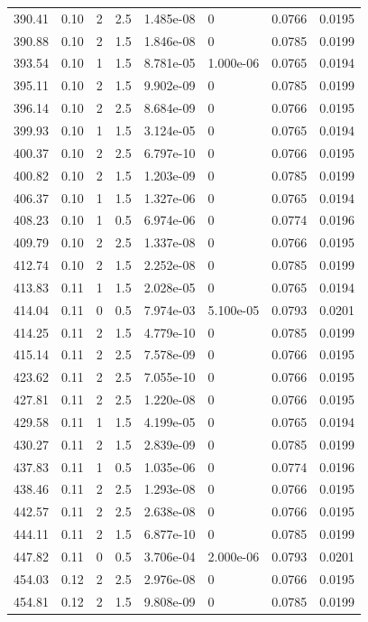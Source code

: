 \documentclass[preview]{standalone}
\begin{document}
{{{\begin{tabular}{L{1.2cm}C{1.2cm} C{0.3cm}C{0.5cm} C{1.4cm}C{1.4cm} C{1.4cm}C{1.4cm}}
  390.41  &  0.10  & 2     & 2.5 &  1.485e-08  & 0  & 0.0766 &  0.0195   \\ 
  390.88  &  0.10  & 2     & 1.5 &  1.846e-08  & 0  & 0.0785 &  0.0199   \\ 
  393.54  &  0.10  & 1     & 1.5 &  8.781e-05  & 1.000e-06  & 0.0765 &  0.0194   \\ 
  395.11  &  0.10  & 2     & 1.5 &  9.902e-09  & 0  & 0.0785 &  0.0199   \\ 
  396.14  &  0.10  & 2     & 2.5 &  8.684e-09  & 0  & 0.0766 &  0.0195   \\ 
  399.93  &  0.10  & 1     & 1.5 &  3.124e-05  & 0  & 0.0765 &  0.0194   \\ 
  400.37  &  0.10  & 2     & 2.5 &  6.797e-10  & 0  & 0.0766 &  0.0195   \\ 
  400.82  &  0.10  & 2     & 1.5 &  1.203e-09  & 0  & 0.0785 &  0.0199   \\ 
  406.37  &  0.10  & 1     & 1.5 &  1.327e-06  & 0  & 0.0765 &  0.0194   \\ 
  408.23  &  0.10  & 1     & 0.5 &  6.974e-06  & 0  & 0.0774 &  0.0196   \\ 
  409.79  &  0.10  & 2     & 2.5 &  1.337e-08  & 0  & 0.0766 &  0.0195   \\ 
  412.74  &  0.10  & 2     & 1.5 &  2.252e-08  & 0  & 0.0785 &  0.0199   \\ 
  413.83  &  0.11  & 1     & 1.5 &  2.028e-05  & 0  & 0.0765 &  0.0194   \\ 
  414.04  &  0.11  & 0     & 0.5 &  7.974e-03  & 5.100e-05  & 0.0793 &  0.0201   \\ 
  414.25  &  0.11  & 2     & 1.5 &  4.779e-10  & 0  & 0.0785 &  0.0199   \\ 
  415.14  &  0.11  & 2     & 2.5 &  7.578e-09  & 0  & 0.0766 &  0.0195   \\ 
  423.62  &  0.11  & 2     & 2.5 &  7.055e-10  & 0  & 0.0766 &  0.0195   \\ 
  427.81  &  0.11  & 2     & 2.5 &  1.220e-08  & 0  & 0.0766 &  0.0195   \\ 
  429.58  &  0.11  & 1     & 1.5 &  4.199e-05  & 0  & 0.0765 &  0.0194   \\ 
  430.27  &  0.11  & 2     & 1.5 &  2.839e-09  & 0  & 0.0785 &  0.0199   \\ 
  437.83  &  0.11  & 1     & 0.5 &  1.035e-06  & 0  & 0.0774 &  0.0196   \\ 
  438.46  &  0.11  & 2     & 2.5 &  1.293e-08  & 0  & 0.0766 &  0.0195   \\ 
  442.57  &  0.11  & 2     & 2.5 &  2.638e-08  & 0  & 0.0766 &  0.0195   \\ 
  444.11  &  0.11  & 2     & 1.5 &  6.877e-10  & 0  & 0.0785 &  0.0199   \\ 
  447.82  &  0.11  & 0     & 0.5 &  3.706e-04  & 2.000e-06  & 0.0793 &  0.0201   \\ 
  454.03  &  0.12  & 2     & 2.5 &  2.976e-08  & 0  & 0.0766 &  0.0195   \\ 
  454.81  &  0.12  & 2     & 1.5 &  9.808e-09  & 0  & 0.0785 &  0.0199   \\ 
\hline 
\end{tabular} 

}}}
\end{document}
